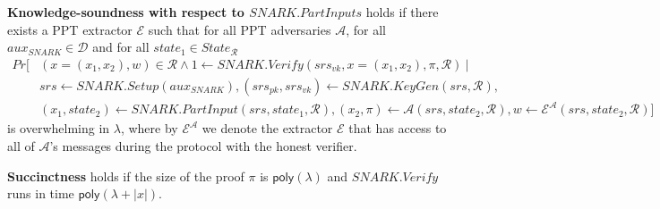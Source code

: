 \begin{dfn}
\noindent \textbf{Knowledge-soundness with respect to $\mathit{SNARK.PartInputs}$}
holds if there exists a PPT extractor $\mathcal{E}$ such that for all PPT 
adversaries $\mathcal{A}$, for all $\mathit{aux_{\mathit{SNARK}}} \in \mathcal{D}$ and for all $\mathit{state_1} \in \mathit{State_{\mathcal{R}}}$
\begin{align*}
\mathit{Pr}[&(x = (x_1, x_2), w) \in \mathcal{R} \wedge 1 \leftarrow \mathit{SNARK.Verify}(\mathit{srs_{vk}}, x = (x_1, x_2), \pi, \mathcal{R}) \ | \\
& \mathit{srs} \leftarrow \mathit{SNARK.Setup}(\mathit{aux_{\mathit{SNARK}}}), (\mathit{srs_{pk}}, \mathit{srs_{vk}})\leftarrow \mathit{SNARK.KeyGen}(\mathit{srs}, \mathcal{R}), \\ 
& (x_1, \mathit{state}_2) \leftarrow \mathit{SNARK.PartInput}(\mathit{srs}, \mathit{state}_1, \mathcal{R}), 
(x_2, \pi) \leftarrow \mathcal{A}(\mathit{srs}, \mathit{state}_2, \mathcal{R}),  
w \leftarrow \mathcal{E}^{\mathcal{A}}(srs,\mathit{state_2}, \mathcal{R})]
\end{align*}
is overwhelming in $\lambda$, where by $\mathcal{E}^{\mathcal{A}}$ we denote the extractor $\mathcal{E}$ that has access to all of 
$\mathcal{A}$'s messages during the protocol with the honest verifier. 

\noindent \textbf{Succinctness} holds if the size of the proof $\pi$ is $\mathsf{poly}(\lambda)$ and $\mathit{SNARK.Verify}$ runs in time 
$\mathsf{poly}(\lambda + |x|)$. %
\end{dfn}

